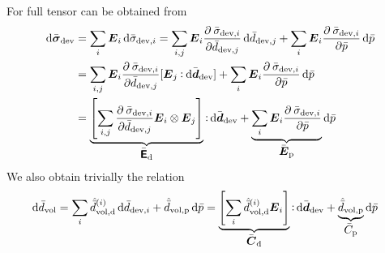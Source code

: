\documentclass[10pt,a4paper]{article}
\newcommand{\ded}{\mathrm{d}}
\newcommand{\dep}{\mathrm{p}}
\begin{document}
For full tensor can be obtained from
\begin{align}
 \dif\bar{\ts\sigma}_\dev 
	&= \sum_i \ts E_i \dif\bar{\sigma}_{\dev,i}
	= \sum_{i,j} \ts E_i \pd{\bar{\sigma}_{\dev,i}}{\bar{d}_{\dev,j}} \dif\bar{d}_{\dev,j} + \sum_i \ts E_i \pd{\bar{\sigma}_{\dev,i}}{\bar{p}}\dif\bar{p}
\nonumber\\
	&= \sum_{i,j} \ts E_i \pd{\bar{\sigma}_{\dev,i}}{\bar{d}_{\dev,j}} [\ts E_j \dprod \dif\bar{\ts d}_{\dev}] + \sum_i \ts E_i \pd{\bar{\sigma}_{\dev,i}}{\bar{p}}\dif\bar{p}
\nonumber\\
    &= \underbrace{\left[\sum_{i,j} \pd{\bar{\sigma}_{\dev,i}}{\bar{d}_{\dev,j}} \ts E_i \outerp \ts E_j\right]}_{\displaystyle\bar{\tf E}_\ded} \dprod \dif\bar{\ts d}_{\dev}
	  + \underbrace{\sum_i \ts E_i \pd{\bar{\sigma}_{\dev,i}}{\bar{p}}}_{\displaystyle\bar{\ts E}_\dep}\dif\bar{p}
\end{align}
We also obtain trivially the relation
\begin{align}
    \dif\bar{d}_\vol
    & = \sum_{i}\hat{\bar{d}}^{(i)}_{\vol,\ded}\dif\bar{d}_{\dev,i} + \hat{\bar{d}}_{\vol,\dep}\dif\bar{p}
      = \underbrace{\left[\sum_{i}\hat{\bar{d}}^{(i)}_{\vol,\ded} \ts E_i\right]}_{\displaystyle\bar{\ts C}_\ded} \dprod\dif\bar{\ts d}_{\dev} + \underbrace{\hat{\bar{d}}_{\vol,\dep}}_{\displaystyle\bar{C}_\dep}\dif\bar{p}
    \label{eq220}
\end{align}
\end{document}
